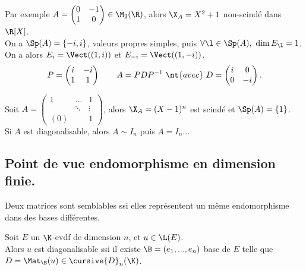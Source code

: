 \documentclass[11pt]{article}
\renewcommand*{\D}{\cursive{D}}
\begin{document}
\begin{ex}{}{}
    Par exemple $A=\begin{pmatrix}0&-1\\1&0\end{pmatrix}\in\M_2(\R)$, alors $\X_A=X^2+1$ non-scindé dans $\R[X]$.\\
    On a $\Sp(A)=\{-i,i\}$, valeurs propres simples, puis $\forall \l \in \Sp(A), ~ \dim E_\l = 1$.\\
    On a alors $E_i = \Vect((1,i))$ et $E_{-i}=\Vect((1,-i))$.
    \begin{equation*}
        P=\begin{pmatrix}
            i&-i\\1&1
        \end{pmatrix} \qquad A = PDP^{-1} ~\nt{avec}~ D=\begin{pmatrix}i&0\\0&-i\end{pmatrix}.
    \end{equation*}
\end{ex}

\begin{ex}{}{}
    Soit $A=\begin{pmatrix}1&\dots&1\\&\ddots&\vdots\\(0)&&1\end{pmatrix}$, alors $\X_A=(X-1)^n$ est scindé et $\Sp(A)=\{1\}$.\\
    Si $A$ est diagonalisable, alors $A\sim I_n$ puis $A=I_n$...
\end{ex}

\subsection{Point de vue endomorphisme en dimension finie.}

\begin{rappel}{}{}
    Deux matrices sont semblables ssi elles représentent un même endomorphisme dans des bases différentes.
\end{rappel}

\begin{defi}{}{}
    Soit $E$ un $\K$-evdf de dimension $n$, et $u\in\L(E)$.\\
    Alors $u$ est diagonalisable ssi il existe $\B = (e_1,...,e_n)$ base de $E$ telle que $D=\Mat_\B(u)\in\D_n(\K)$.
\end{defi}
\end{document}
